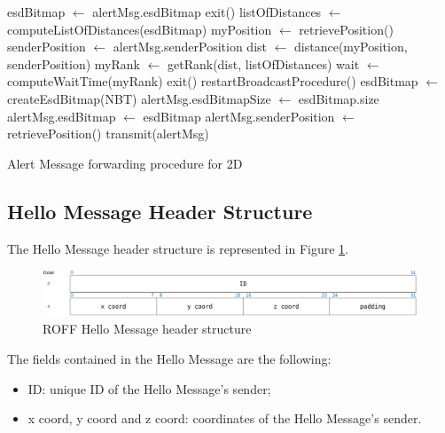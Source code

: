 		\begin{algorithm}[H]
			\begin{algorithmic}[1]
				\State esdBitmap $\gets$ alertMsg.esdBitmap
				\State exit()
				\Else
				\State listOfDistances $\gets$ computeListOfDistances(esdBitmap)
				\State myPosition $\gets$ retrievePosition()
				\State senderPosition $\gets$ alertMsg.senderPosition
				\State dist $\gets$ distance(myPosition, senderPosition)
				\State myRank $\gets$ getRank(dist, listOfDistances)
				\State wait $\gets$ computeWaitTime(myRank)
				\State exit()
				\State restartBroadcastProcedure()
				\Else
				\State esdBitmap $\gets$ createEsdBitmap(NBT)
				\State alertMsg.esdBitmapSize $\gets$ esdBitmap.size
				\State alertMsg.esdBitmap $\gets$ esdBitmap
				\State alertMsg.senderPosition $\gets$ retrievePosition()
				\State transmit(alertMsg)
				\EndIf 
				\EndIf
			\end{algorithmic}
			\caption{Alert Message forwarding procedure for 2D}
			\label{alg:roff-alert-message-forwarding}
		\end{algorithm}
		
		
		\subsection{Hello Message Header Structure}
			The Hello Message header structure is represented in Figure \ref{fig:roffHelloHeader}.
				
			\begin{figure}[H]
				\centering
				\includegraphics[width=\textwidth]{immagini/roffHelloHeader}
				\caption{ROFF Hello Message header structure}
				\label{fig:roffHelloHeader}
			\end{figure}
				
			The fields contained in the Hello Message are the following:
			\begin{itemize}
				\item ID: unique ID of the Hello Message's sender;
				\item x coord, y coord and z coord: coordinates of the Hello Message's sender.
			\end{itemize}
		
